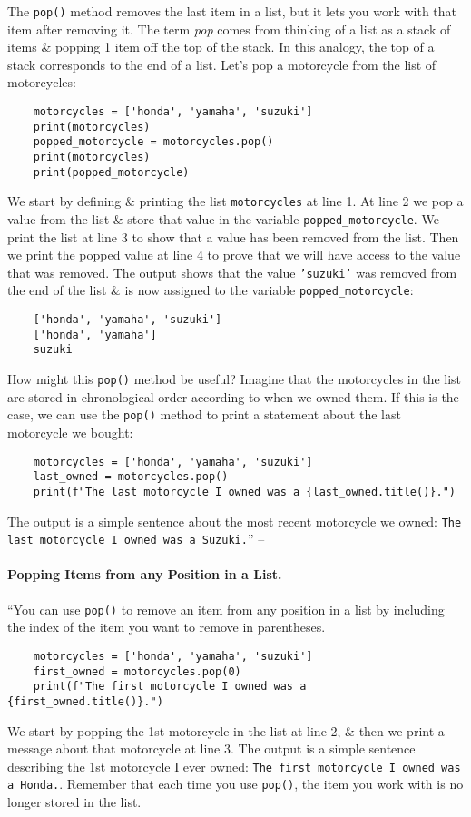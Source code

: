 \documentclass[oneside]{book}
\numberwithin{equation}{section}
\begin{document}
The \texttt{pop()} method removes the last item in a list, but it lets you work with that item after removing it. The term \textit{pop} comes from thinking of a list as a stack of items \& popping 1 item off the top of the stack. In this analogy, the top of a stack corresponds to the end of a list.  Let's pop a motorcycle from the list of motorcycles:
\begin{verbatim}
	motorcycles = ['honda', 'yamaha', 'suzuki']
	print(motorcycles)
	popped_motorcycle = motorcycles.pop()
	print(motorcycles)
	print(popped_motorcycle)
\end{verbatim}
We start by defining \& printing the list \texttt{motorcycles} at line 1. At line 2 we pop a value from the list \& store that value in the variable \verb|popped_motorcycle|. We print the list at line 3 to show that a value has been removed from the list. Then we print the popped value at line 4 to prove that we will have access to the value that was removed. The output shows that the value \texttt{'suzuki'} was removed from the end of the list \& is now assigned to the variable \verb|popped_motorcycle|:
\begin{verbatim}
	['honda', 'yamaha', 'suzuki']
	['honda', 'yamaha']
	suzuki
\end{verbatim}
How might this \texttt{pop()} method be useful? Imagine that the motorcycles in the list are stored in chronological order according to when we owned them. If this is the case, we can use the \texttt{pop()} method to print a statement about the last motorcycle we bought:
\begin{verbatim}
	motorcycles = ['honda', 'yamaha', 'suzuki']
	last_owned = motorcycles.pop()
	print(f"The last motorcycle I owned was a {last_owned.title()}.")
\end{verbatim}
The output is a simple sentence about the most recent motorcycle we owned: \texttt{The last motorcycle I owned was a Suzuki.}'' -- \cite[pp. 39--40]{Matthes2019}

\paragraph{Popping Items from any Position in a List.} ``You can use \texttt{pop()} to remove an item from any position in a list by including the index of the item you want to remove in parentheses.
\begin{verbatim}
	motorcycles = ['honda', 'yamaha', 'suzuki']
	first_owned = motorcycles.pop(0)
	print(f"The first motorcycle I owned was a {first_owned.title()}.")
\end{verbatim}
We start by popping the 1st motorcycle in the list at line 2, \& then we print a message about that motorcycle at line 3. The output is a simple sentence describing the 1st motorcycle I ever owned: \texttt{The first motorcycle I owned was a Honda.}. Remember that each time you use \texttt{pop()}, the item you work with is no longer stored in the list.
\end{document}
